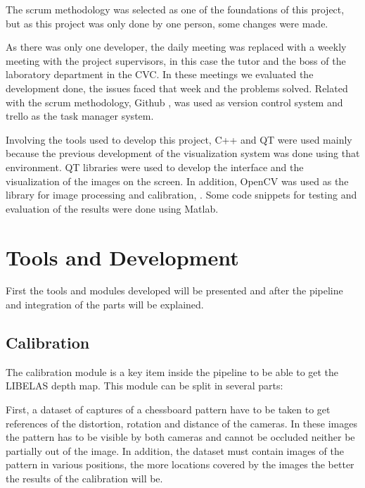 \documentclass[10pt,a4paper,twocolumn,twoside]{article}
\begin{document}
	The scrum methodology was selected as one of the foundations of this project, but as this project was only done by one person, some changes were made. 
	
	As there was only one developer, the daily meeting was replaced with a weekly meeting with the project supervisors, in this case the tutor and the boss of the laboratory department in the CVC. In these meetings we evaluated the development done, the issues faced that week and the problems solved. Related with the scrum methodology, Github \cite{web:github},\cite{web:githubDesktop} was used as version control system and trello\cite{web:trello} as the task manager system.
	
	Involving the tools used to develop this project, C++ and QT \cite{web:qt} were used mainly because the previous development of the visualization system was done using that environment. QT libraries were used to develop the interface and the visualization of the images on the screen. In addition, OpenCV was used as the library for image processing and calibration, \cite{web:opencv}. Some code snippets for testing and evaluation of the results were done using Matlab\cite{web:matlab}. 
	
	
	\section{Tools and Development}
	
	First the tools and modules developed will be presented and after the pipeline and integration of the parts will be explained. 
	
	\subsection{Calibration}
	\label{sec:calib}
	
	The calibration module is a key item inside the pipeline to be able to get the LIBELAS depth map. This module can be split in several parts:  
	
	First, a dataset of captures of a chessboard pattern have to be taken to get references of the distortion, rotation and distance of the cameras. In these images the pattern has to be visible by both cameras and cannot be occluded neither be partially out of the image. In addition, the dataset must contain images of the pattern in various positions, the more locations covered by the images the better the results of the calibration will be. 
	
\end{document}

